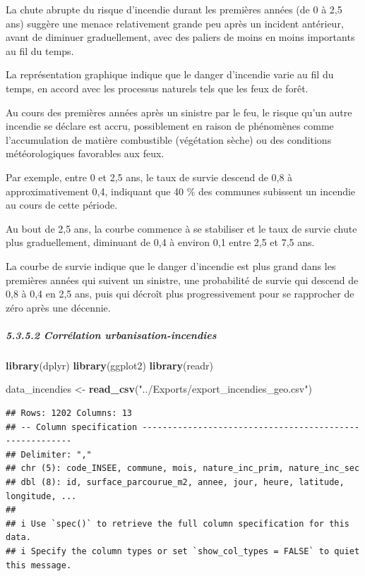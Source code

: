 \documentclass[
]{article}
\newenvironment{Shaded}{\begin{snugshade}}{\end{snugshade}}
\newcommand{\FunctionTok}[1]{\textcolor[rgb]{0.13,0.29,0.53}{\textbf{#1}}}
\newcommand{\NormalTok}[1]{#1}
\newcommand{\OtherTok}[1]{\textcolor[rgb]{0.56,0.35,0.01}{#1}}
\newcommand{\StringTok}[1]{\textcolor[rgb]{0.31,0.60,0.02}{#1}}
\begin{document}
La chute abrupte du risque d'incendie durant les premières années (de 0
à 2,5 ans) suggère une menace relativement grande peu après un incident
antérieur, avant de diminuer graduellement, avec des paliers de moins en
moins importants au fil du temps.

La représentation graphique indique que le danger d'incendie varie au
fil du temps, en accord avec les processus naturels tels que les feux de
forêt.

Au cours des premières années après un sinistre par le feu, le risque
qu'un autre incendie se déclare est accru, possiblement en raison de
phénomènes comme l'accumulation de matière combustible (végétation
sèche) ou des conditions météorologiques favorables aux feux.

Par exemple, entre 0 et 2,5 ans, le taux de survie descend de 0,8 à
approximativement 0,4, indiquant que 40 \% des communes subissent un
incendie au cours de cette période.

Au bout de 2,5 ans, la courbe commence à se stabiliser et le taux de
survie chute plus graduellement, diminuant de 0,4 à environ 0,1 entre
2,5 et 7,5 ans.

La courbe de survie indique que le danger d'incendie est plus grand dans
les premières années qui suivent un sinistre, une probabilité de survie
qui descend de 0,8 à 0,4 en 2,5 ans, puis qui décroît plus
progressivement pour se rapprocher de zéro après une décennie.

\subparagraph{5.3.5.2 Corrélation
urbanisation-incendies}\label{corruxe9lation-urbanisation-incendies}

\begin{Shaded}
\begin{Highlighting}[]
\FunctionTok{library}\NormalTok{(dplyr)}
\FunctionTok{library}\NormalTok{(ggplot2)}
\FunctionTok{library}\NormalTok{(readr)}

\NormalTok{data\_incendies }\OtherTok{\textless{}{-}} \FunctionTok{read\_csv}\NormalTok{(}\StringTok{"../Exports/export\_incendies\_geo.csv"}\NormalTok{)}
\end{Highlighting}
\end{Shaded}

\begin{verbatim}
## Rows: 1202 Columns: 13
## -- Column specification --------------------------------------------------------
## Delimiter: ","
## chr (5): code_INSEE, commune, mois, nature_inc_prim, nature_inc_sec
## dbl (8): id, surface_parcourue_m2, annee, jour, heure, latitude, longitude, ...
## 
## i Use `spec()` to retrieve the full column specification for this data.
## i Specify the column types or set `show_col_types = FALSE` to quiet this message.
\end{verbatim}
\end{document}
